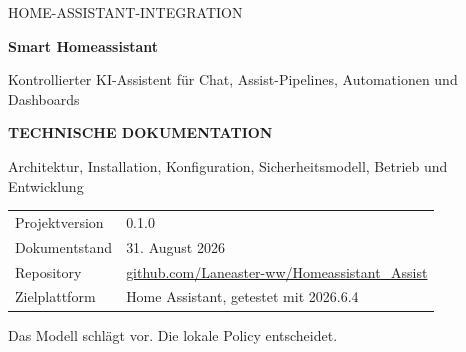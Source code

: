 \documentclass[
  11pt,
  a4paper,
  oneside,
  parskip=half
]{scrreprt}
\newcommand{\projecturl}{https://github.com/Laneaster-ww/Homeassistant\_Assist}
\begin{document}
\begin{titlepage}
  \pagecolor{SmartDark}
  \color{SmartLightGray}

  \vspace*{18mm}

  {\Large\ttfamily\textcolor{SmartBlue}{HOME-ASSISTANT-INTEGRATION}\par}
  \vspace{9mm}

  {\fontsize{34}{40}\selectfont\bfseries Smart Homeassistant\par}
  \vspace{5mm}

  {\Large
    Kontrollierter KI-Assistent für Chat, Assist-Pipelines,
    Automationen und Dashboards
  \par}

  \vspace{18mm}

  \noindent
  \colorbox{SmartPanel}{%
    \begin{minipage}{0.89\textwidth}
      \color{SmartLightGray}
      \vspace{5mm}
      \textbf{\textcolor{SmartBlue}{TECHNISCHE DOKUMENTATION}}\par
      \vspace{3mm}
      Architektur, Installation, Konfiguration, Sicherheitsmodell,
      Betrieb und Entwicklung
      \vspace{5mm}
    \end{minipage}
  }

  \vfill

  \begin{tabular}{@{}ll@{}}
    \textcolor{SmartGray}{Projektversion} & 0.1.0 \\[2mm]
    \textcolor{SmartGray}{Dokumentstand} & 31. August 2026 \\[2mm]
    \textcolor{SmartGray}{Repository} & \href{\projecturl}{github.com/Laneaster-ww/Homeassistant\_Assist} \\[2mm]
    \textcolor{SmartGray}{Zielplattform} & Home Assistant, getestet mit 2026.6.4
  \end{tabular}

  \vspace{12mm}

  {\small\textcolor{SmartGray}{
    Das Modell schlägt vor. Die lokale Policy entscheidet.
  }\par}
\end{titlepage}

\nopagecolor
\color{SmartDark}
\end{document}
